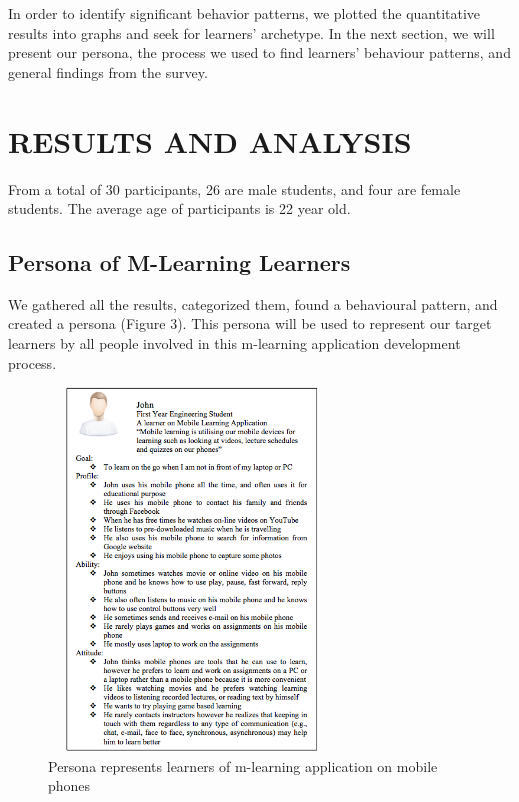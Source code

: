 \documentclass[a4paper,twoside]{article}
\begin{document}
In order to identify significant behavior patterns, we plotted the quantitative results into graphs and seek for learners' archetype. In the next section, we will present our persona, the process we used to find learners' behaviour patterns, and general findings from the survey. 

\section{RESULTS AND ANALYSIS} 

\noindent From a total of 30 participants, 26 are male students, and four are female students. The average age of participants is 22 year old. 

\subsection{Persona of M-Learning Learners}

\noindent We gathered all the results, categorized them, found a behavioural pattern, and created a persona (Figure 3). This persona will be used to represent our target learners by all people involved in this m-learning application development process. 
\begin{figure}
\centering
\includegraphics[height=3.8in, width=3in]{fig3}
\caption{Persona represents learners of m-learning application on mobile phones}
\end{figure}
\end{document}
